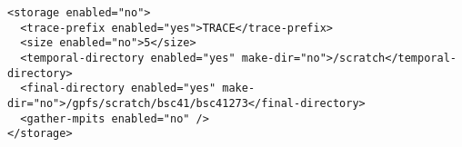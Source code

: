 \begin{verbatim}
<storage enabled="no">
  <trace-prefix enabled="yes">TRACE</trace-prefix>
  <size enabled="no">5</size>
  <temporal-directory enabled="yes" make-dir="no">/scratch</temporal-directory>
  <final-directory enabled="yes" make-dir="no">/gpfs/scratch/bsc41/bsc41273</final-directory>
  <gather-mpits enabled="no" />
</storage>
\end{verbatim}
